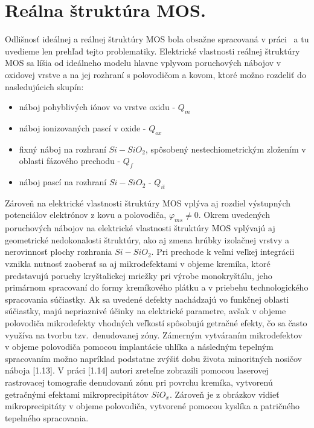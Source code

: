 \section{Reálna štruktúra MOS.}

Odlišnosť ideálnej a reálnej štruktúry MOS bola obsažne spracovaná v
práci~\cite{1.12} a tu uvedieme len prehľad tejto
problematiky. Elektrické vlastnosti reálnej štruktúry MOS sa líšia od
ideálneho modelu hlavne vplyvom poruchových nábojov v oxidovej vrstve
a na jej rozhraní s polovodičom a kovom, ktoré možno rozdeliť do
nasledujúcich skupín:

\begin{itemize}
\item náboj pohyblivých iónov vo vrstve oxidu - $Q_{m}$
\item náboj ionizovaných pascí v oxide - $Q_{ox}$
\item fixný náboj na rozhraní $Si-SiO_2$, spôsobený nestechiometrickým
  zložením v oblasti fázového prechodu - $Q_f$
\item náboj pascí na rozhraní $Si-SiO_2$ - $Q_{it}$
\end{itemize}

\par Zároveň na elektrické vlastnosti štruktúry MOS vplýva aj rozdiel
výstupných potenciálov elektrónov z kovu a polovodiča,
$\varphi_{ms}\neq{0}$.  Okrem uvedených poruchových nábojov na
elektrické vlastnosti štruktúry MOS vplývajú aj geometrické
nedokonalosti štruktúry, ako aj zmena hrúbky izolačnej vrstvy a
nerovinnosť plochy rozhrania $Si-SiO_2$. Pri prechode k veľmi veľkej
integrácii vznikla nutnosť zaoberať sa aj mikrodefektami v objeme
kremíka, ktoré predstavujú poruchy kryštalickej mriežky pri výrobe
monokryštálu, jeho primárnom spracovaní do formy kremíkového plátku a
v priebehu technologického spracovania súčiastky. Ak sa uvedené
defekty nachádzajú vo funkčnej oblasti súčiastky, majú nepriaznivé
účinky na elektrické parametre, avšak v objeme polovodiča mikrodefekty
vhodných veľkostí spôsobujú getračné efekty, čo sa často využíva na
tvorbu tzv.\ denudovanej zóny.  Zámerným vytváraním mikrodefektov v
objeme polovodiča pomocou implantácie uhlíka a následným tepelným
spracovaním možno napríklad podstatne zvýšiť dobu života minoritných
nosičov náboja [1.13]. V práci [1.14] autori zreteľne zobrazili
pomocou laserovej rastrovacej tomografie denudovanú zónu pri povrchu
kremíka, vytvorenú getračnými efektami mikroprecipitátov
$SiO_x$. Zároveň je z obrázkov vidieť mikroprecipitáty v objeme
polovodiča, vytvorené pomocou kyslíka a patričného tepelného
spracovania.

